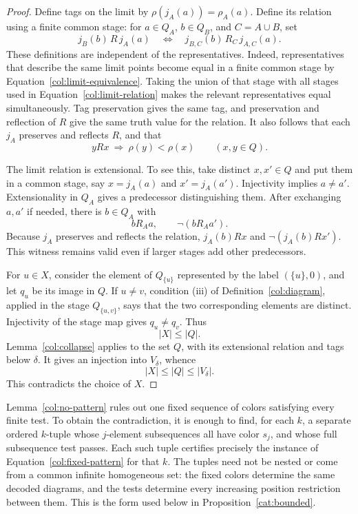 \begin{proof}
Define tags on the limit by
\(\rho(j_A(a))=\rho_A(a)\).  Define its relation using a
finite common stage: for \(a\in Q_A\), \(b\in Q_B\), and
\(C=A\cup B\), set
\begin{equation}\label{col:limit-relation}
 j_B(b)\,R\,j_A(a)
 \quad\Longleftrightarrow\quad
 j_{B,C}(b)\,R_C\,j_{A,C}(a).
\end{equation}
These definitions are independent of the representatives.
Indeed, representatives that describe the same limit points
become equal in a finite common stage by
Equation~\eqref{col:limit-equivalence}.  Taking the union of
that stage with all stages used in
Equation~\eqref{col:limit-relation} makes the relevant
representatives equal simultaneously.  Tag preservation
gives the same tag, and preservation and reflection of
\(R\) give the same truth value for the relation.
It also follows that each \(j_A\) preserves and reflects
\(R\), and that
\[
                         yRx\ \Longrightarrow\ \rho(y)<\rho(x)
                         \qquad(x,y\in Q).
\]

The limit relation is extensional.  To see this, take
distinct \(x,x'\in Q\) and put them in a common stage,
say \(x=j_A(a)\) and \(x'=j_A(a')\).  Injectivity implies
\(a\ne a'\).  Extensionality in \(Q_A\) gives a predecessor
distinguishing them.  After exchanging \(a,a'\) if needed,
there is \(b\in Q_A\) with
\[
                            bR_Aa,\qquad \neg(bR_Aa').
\]
Because \(j_A\) preserves and reflects the relation,
\(j_A(b)Rx\) and \(\neg(j_A(b)Rx')\).
This witness remains valid even if larger stages add
other predecessors.

For \(u\in X\), consider the element of \(Q_{\{u\}}\)
represented by the label \((\{u\},0)\), and let \(q_u\)
be its image in \(Q\).  If \(u\ne v\), condition
\textup{(iii)} of Definition~\ref{col:diagram}, applied
in the stage \(Q_{\{u,v\}}\), says that the two
corresponding elements are distinct.  Injectivity of
the stage map gives \(q_u\ne q_v\).  Thus
\[
                              |X|\le |Q|.
\]
Lemma~\ref{col:collapse} applies to the set \(Q\), with
its extensional relation and tags below \(\delta\).
It gives an injection into \(V_\delta\), whence
\[
                          |X|\le |Q|\le |V_\delta|.
\]
This contradicts the choice of \(X\).
\end{proof}

\begin{remark}
\label{col:pattern-quantifiers}
Lemma~\ref{col:no-pattern} rules out one fixed sequence of
colors satisfying every finite test.  To obtain the
contradiction, it is enough to find, for each \(k\), a
separate ordered \(k\)-tuple whose \(j\)-element subsequences
all have color \(s_j\), and whose full subsequence test
passes.  Each such tuple certifies precisely the instance
of Equation~\eqref{col:fixed-pattern} for that \(k\).
The tuples need not be nested or come from a common
infinite homogeneous set: the fixed colors determine
the same decoded diagrams, and the tests determine
every increasing position restriction between them.
This is the form used below in Proposition~\ref{cat:bounded}.
\end{remark}

